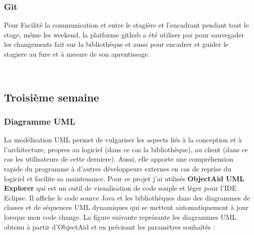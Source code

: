 \documentclass[12pt]{report}
\begin{document}
\subsubsection{Git}
Pour Facilité la communication et entre le stagière et l'encadrant pendant tout le stage, même les weekend, la platforme github a été utiliser par pour sauvegader les changements fait sur la bibliothèque et aussi pour encadrer et guider le stagiere au fure et à mesure de son aprentissage.

~\\
\subsection{Troisième semaine}

\subsubsection{Diagramme UML}

La modélisation UML permet de vulgariser les aspects liés à la conception et à l’architecture, propres au logiciel (dans ce cas la bibliothèque), au client (dans ce cas les utilisateurs de cette derniere). Aussi, elle apporte une compréhension rapide du programme à d’autres développeurs externes en cas de reprise du logiciel et facilite sa maintenance. \newline
Pour ce projet j'ai utilisés \textbf{ObjectAid UML Explorer} qui est un outil de visualisation de code souple et léger pour l'IDE Eclipse. Il affiche le code source Java et les bibliothèques dans des diagrammes de classes et de séquences UML dynamiques qui se mettent automatiquement à jour lorsque mon code change.\newpage
La figure suivante représante les diagrammes UML obtenu à partir d'ObjectAid et en précisant les paramètres souhaités :
\end{document}
